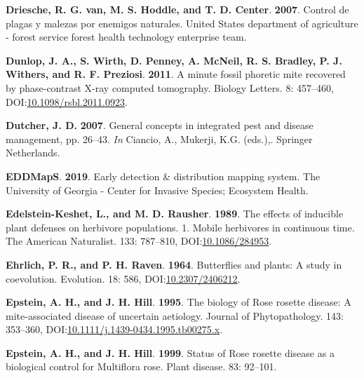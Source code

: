 \documentclass[12pt,final,CPage]{ufthesis}
\newlength{\cslhangindent}
\newenvironment{CSLReferences}[2] %
{%
	\setlength{\parindent}{0pt}
	\ifodd #1 \everypar{\setlength{\hangindent}{\cslhangindent}}\ignorespaces\fi
	\ifnum #2 > 0
	\setlength{\parskip}{#2\baselineskip}
	\fi
}%
{}
\begin{document}
{\begin{CSLReferences}{1}{0}
  \leavevmode{}%
  \textbf{Driesche, R. G. van, M. S. Hoddle, and T. D. Center}. \textbf{2007}. Control de plagas y malezas por enemigos naturales. {United States} department of agriculture - forest service forest health technology enterprise team.

  \leavevmode{}%
  \textbf{Dunlop, J. A., S. Wirth, D. Penney, A. McNeil, R. S. Bradley, P. J. Withers, and R. F. Preziosi}. \textbf{2011}. A minute fossil phoretic mite recovered by phase-contrast {X-ray} computed tomography. Biology Letters. 8: 457--460, DOI:\href{https://doi.org/10.1098/rsbl.2011.0923}{10.1098/rsbl.2011.0923}.

  \leavevmode{}%
  \textbf{Dutcher, J. D.} \textbf{2007}. General concepts in integrated pest and disease management, pp. 26--43. \emph{In} Ciancio, A., Mukerji, K.G. (eds.),. Springer Netherlands.

  \leavevmode{}%
  \textbf{EDDMapS}. \textbf{2019}. Early detection \& distribution mapping system. The University of Georgia - Center for Invasive Species; Ecosystem Health.

  \leavevmode{}%
  \textbf{Edelstein-Keshet, L., and M. D. Rausher}. \textbf{1989}. The effects of inducible plant defenses on herbivore populations. 1. Mobile herbivores in continuous time. The American Naturalist. 133: 787--810, DOI:\href{https://doi.org/10.1086/284953}{10.1086/284953}.

  \leavevmode{}%
  \textbf{Ehrlich, P. R., and P. H. Raven}. \textbf{1964}. Butterflies and plants: A study in coevolution. Evolution. 18: 586, DOI:\href{https://doi.org/10.2307/2406212}{10.2307/2406212}.

  \leavevmode{}%
  \textbf{Epstein, A. H., and J. H. Hill}. \textbf{1995}. The biology of {Rose rosette disease}: A mite-associated disease of uncertain aetiology. Journal of Phytopathology. 143: 353--360, DOI:\href{https://doi.org/10.1111/j.1439-0434.1995.tb00275.x}{10.1111/j.1439-0434.1995.tb00275.x}.

  \leavevmode{}%
  \textbf{Epstein, A. H., and J. H. Hill}. \textbf{1999}. Status of {Rose rosette disease} as a biological control for {Multiflora rose}. Plant disease. 83: 92--101.


\end{CSLReferences}}
\end{document}
